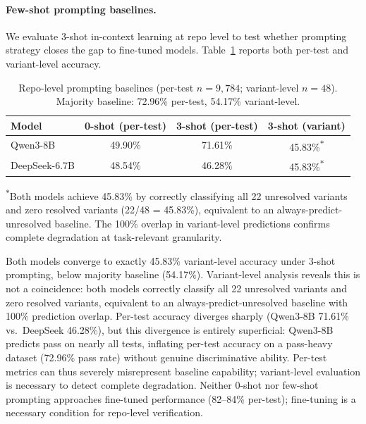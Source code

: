 \paragraph{Few-shot prompting baselines.}
\label{app:few_shot}
We evaluate 3-shot in-context learning at repo level to test whether prompting strategy closes the gap to fine-tuned models. Table~\ref{tab:few_shot} reports both per-test and variant-level accuracy.

\begin{table}[h]
\centering
\small
\caption{Repo-level prompting baselines (per-test $n{=}9{,}784$; variant-level $n{=}48$). Majority baseline: 72.96\% per-test, 54.17\% variant-level.}
\label{tab:few_shot}
\setlength{\tabcolsep}{6pt}
\begin{tabular}{lccc}
\toprule
\textbf{Model} & \textbf{0-shot (per-test)} & \textbf{3-shot (per-test)} & \textbf{3-shot (variant)} \\
\midrule
Qwen3-8B & 49.90\% & 71.61\% & 45.83\%\textsuperscript{$\ast$} \\
DeepSeek-6.7B & 48.54\% & 46.28\% & 45.83\%\textsuperscript{$\ast$} \\
\bottomrule
\end{tabular}

\vspace{2pt}
{\footnotesize \textsuperscript{$\ast$}Both models achieve 45.83\% by correctly classifying all 22 unresolved variants and zero resolved variants (22/48 = 45.83\%), equivalent to an always-predict-unresolved baseline. The 100\% overlap in variant-level predictions confirms complete degradation at task-relevant granularity.}
\end{table}

Both models converge to exactly 45.83\% variant-level accuracy under 3-shot prompting, below majority baseline (54.17\%). Variant-level analysis reveals this is not a coincidence: both models correctly classify all 22 unresolved variants and zero resolved variants, equivalent to an always-predict-unresolved baseline with 100\% prediction overlap. Per-test accuracy diverges sharply (Qwen3-8B 71.61\% vs.\ DeepSeek 46.28\%), but this divergence is entirely superficial: Qwen3-8B predicts pass on nearly all tests, inflating per-test accuracy on a pass-heavy dataset (72.96\% pass rate) without genuine discriminative ability. Per-test metrics can thus severely misrepresent baseline capability; variant-level evaluation is necessary to detect complete degradation. Neither 0-shot nor few-shot prompting approaches fine-tuned performance (82--84\% per-test); fine-tuning is a necessary condition for repo-level verification.

